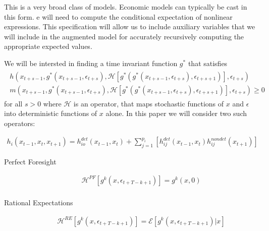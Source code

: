 \documentclass[12pt]{article}
\begin{document}
This is a very broad class of models.  Economic models can typically 
be cast in this form.  e will need to compute the conditional expectation of nonlinear expressions.  This specification will allow us to include auxiliary
variables that we will include in the augmented model for accurately recursively computing  the appropriate expected values.

We will be intersted in
finding a time invariant function $g^\ast$ that satisfies
\begin{gather}
  \begin{split}
h(x_{t+s-1},g^\ast(x_{t+s-1},\epsilon_{t+s}),\mathcal{H}[g^\ast(g^\ast(x_{t+s-1},\epsilon_{t+s}),\epsilon_{t+s+1})],\epsilon_{t+s}) \\
m(x_{t+s-1},g^\ast(x_{t+s-1},\epsilon_{t+s}),\mathcal{H}[g^\ast(g^\ast(x_{t+s-1},\epsilon_{t+s}),\epsilon_{t+s+1})],\epsilon_{t+s}) \ge 0  \label{theProblem}
  \end{split}
 \end{gather}
 for all $s>0$ where $\mathcal{H}$ is an operator, 
  that maps stochastic functions of $x$ and $\epsilon$ into deterministic 
functions of $x$ alone.  In this paper we will consider two such operators:

\begin{gather*}
  h_i(x_{t-1},x_{t},x_{t+1})=h^{det}_{io}(x_{t-1},x_{t})+\sum_{j=1}^{p_i} [h^{det}_{ij}(x_{t-1},x_{t})h^{nondet}_{ij}(x_{t+1})]
\end{gather*}

\begin{description}
\item[Perfect Foresight]
\begin{gather*}
     \mathcal{H}^{PF}[g^{k}(x,\epsilon_{t+T-k+1})]=
g^{k}(x,0)\\
\end{gather*}


\item[Rational Expectations] 
\begin{gather*}
     \mathcal{H}^{RE}[g^{k}(x,\epsilon_{t+T-k+1})]=
\mathcal{E}[g^{k}(x,\epsilon_{t+T-k+1})|x]\\
\end{gather*}

 \end{description}
\end{document}
